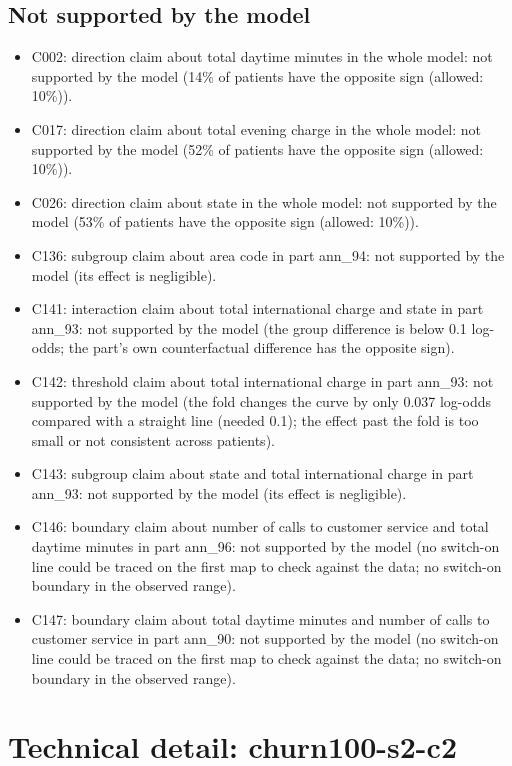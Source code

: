 \documentclass[a4paper,10pt]{article}
\newif\ifreviewmarks
\newcommand{\reviewrule}{\noindent{\color{BrickRed}\rule{\linewidth}{0.8pt}}}
\newenvironment{drafted}[1][]{%
  \ifreviewmarks\par\addvspace{\medskipamount}\reviewrule\par\nopagebreak
  \noindent{\color{BrickRed}\sffamily\footnotesize\textbf{Thesis Draft}\quad #1\hfill review}\par\nopagebreak\smallskip\fi}{%
  \ifreviewmarks\par\smallskip\noindent{\color{BrickRed}\sffamily\footnotesize end of thesis draft}\par\nopagebreak\reviewrule\par\medskip\fi}
\begin{document}
\begin{drafted}[plain-language layer: churn100-s2-c2]
\subsection{Not supported by the model}
\begin{itemize}\setlength\itemsep{0pt}\small
\item C002: direction claim about total daytime minutes in the whole model: not supported by the model (14\% of patients have the opposite sign (allowed: 10\%)).
\item C017: direction claim about total evening charge in the whole model: not supported by the model (52\% of patients have the opposite sign (allowed: 10\%)).
\item C026: direction claim about state in the whole model: not supported by the model (53\% of patients have the opposite sign (allowed: 10\%)).
\item C136: subgroup claim about area code in part ann\_\allowbreak{}94: not supported by the model (its effect is negligible).
\item C141: interaction claim about total international charge and state in part ann\_\allowbreak{}93: not supported by the model (the group difference is below 0.1 log-odds; the part's own counterfactual difference has the opposite sign).
\item C142: threshold claim about total international charge in part ann\_\allowbreak{}93: not supported by the model (the fold changes the curve by only 0.037 log-odds compared with a straight line (needed 0.1); the effect past the fold is too small or not consistent across patients).
\item C143: subgroup claim about state and total international charge in part ann\_\allowbreak{}93: not supported by the model (its effect is negligible).
\item C146: boundary claim about number of calls to customer service and total daytime minutes in part ann\_\allowbreak{}96: not supported by the model (no switch-on line could be traced on the first map to check against the data; no switch-on boundary in the observed range).
\item C147: boundary claim about total daytime minutes and number of calls to customer service in part ann\_\allowbreak{}90: not supported by the model (no switch-on line could be traced on the first map to check against the data; no switch-on boundary in the observed range).
\end{itemize}
\clearpage\section*{Technical detail: churn100-s2-c2}
\renewcommand{\thesubsection}{T.\arabic{subsection}}\setcounter{subsection}{0}

\end{drafted}
\end{document}

